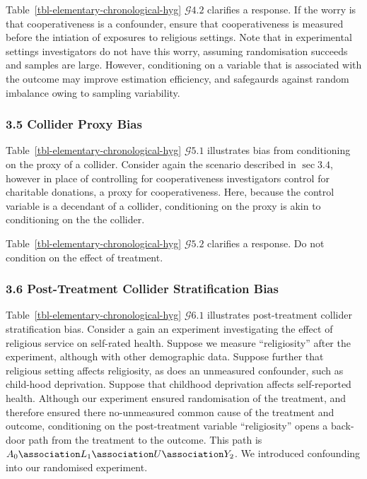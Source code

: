 \documentclass[
  single column]{article}
\begin{document}
Table~\ref{tbl-elementary-chronological-hyg} \(\mathcal{G} 4.2\)
clarifies a response. If the worry is that cooperativeness is a
confounder, ensure that cooperativeness is measured before the intiation
of exposures to religious settings. Note that in experimental settings
investigators do not have this worry, assuming randomisation succeeds
and samples are large. However, conditioning on a variable that is
associated with the outcome may improve estimation efficiency, and
safegaurds against random imbalance owing to sampling variability.

\subsubsection{3.5 Collider Proxy Bias}\label{collider-proxy-bias}

Table~\ref{tbl-elementary-chronological-hyg} \(\mathcal{G} 5.1\)
illustrates bias from conditioning on the proxy of a collider. Consider
again the scenario described in \(\sec 3.4\), however in place of
controlling for cooperativeness investigators control for charitable
donations, a proxy for cooperativeness. Here, because the control
variable is a decendant of a collider, conditioning on the proxy is akin
to conditioning on the the collider.

Table~\ref{tbl-elementary-chronological-hyg} \(\mathcal{G} 5.2\)
clarifies a response. Do not condition on the effect of treatment.

\subsubsection{3.6 Post-Treatment Collider Stratification
Bias}\label{post-treatment-collider-stratification-bias}

Table~\ref{tbl-elementary-chronological-hyg} \(\mathcal{G} 6.1\)
illustrates post-treatment collider stratification bias. Consider a gain
an experiment investigating the effect of religious service on
self-rated health. Suppose we measure ``religiosity'' after the
experiment, although with other demographic data. Suppose further that
religious setting affects religiosity, as does an unmeasured confounder,
such as child-hood deprivation. Suppose that childhood deprivation
affects self-reported health. Although our experiment ensured
randomisation of the treatment, and therefore ensured there
no-unmeasured common cause of the treatment and outcome, conditioning on
the post-treatment variable ``religiosity'' opens a back-door path from
the treatment to the outcome. This path is
\(A_0 \association L_1 \association U \association Y_2\). We introduced
confounding into our randomised experiment.
\end{document}
